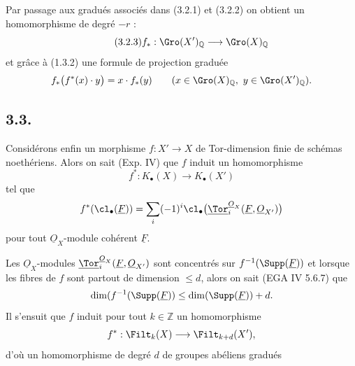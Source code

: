 
Par
passage aux gradués associés dans (3.2.1) et (3.2.2) on obtient un homomorphisme de degré \(-r\) :
\begin{equation}\tag{3.2.3}
 f_*:\Gro(X')_{\mathbb Q}\longrightarrow\Gro(X)_{\mathbb Q}
\end{equation}
et grâce à (1.3.2) une formule de projection graduée
\[
 f_*\bigl(f^*(x)\cdot y\bigr)=x\cdot f_*(y)
 \qquad (x\in\Gro(X)_{\mathbb Q},\ y\in\Gro(X')_{\mathbb Q}).
\]

\subsection*{3.3.}
Considérons enfin un morphisme \(f:X'\to X\) de Tor-dimension finie de schémas noethériens. Alors on sait (Exp. IV) que \(f\) induit un homomorphisme
\[
 f^*:K_\bullet(X)\longrightarrow K_\bullet(X')
\]
tel que
\[
 f^*(\cl_\bullet(\underline{F}))=
 \sum_i(-1)^i\cl_\bullet\bigl(\underline{\Tor}_i^{\underline{O}_X}(\underline{F},\underline{O}_{X'})\bigr)
\]
pour tout \(\underline{O}_X\)-module cohérent \(\underline{F}\).

Les \(\underline{O}_X\)-modules \(\underline{\Tor}_i^{\underline{O}_X}(\underline{F},\underline{O}_{X'})\) sont concentrés sur \(f^{-1}(\Supp(\underline{F}))\) et lorsque les fibres de \(f\) sont partout de dimension \(\leq d\), alors on sait (EGA IV 5.6.7) que
\[
 \dim(f^{-1}(\Supp(\underline{F}))\leq \dim(\Supp(\underline{F}))+d.
\]
Il s'ensuit que \(f\) induit pour tout \(k\in\mathbb Z\) un homomorphisme
\[
 f^*:\Filt_k(X)\longrightarrow\Filt_{k+d}(X'),
\]
d'où un homomorphisme de degré \(d\) de groupes abéliens gradués

